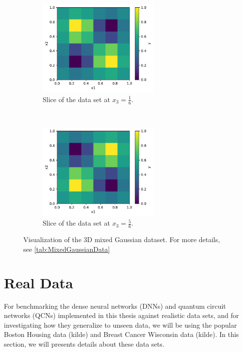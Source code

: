 \begin{figure}[H]
    \centering
    \begin{subfigure}[t]{0.5\textwidth}
        \centering
        \includegraphics[height=1.9in]{latex/figures/gaussian_3D_1.pdf}
        \caption{Slice of the data set at $x_3 = \frac{1}{6}$.}
        
    \end{subfigure}%
    ~ 
    \begin{subfigure}[t]{0.5\textwidth}
        \centering
        \includegraphics[height=1.9in]{latex/figures/gaussian_3D_2.pdf}
        \caption{Slice of the data set at $x_3 = \frac{5}{6}$.}
    \end{subfigure}
    \caption{Visualization of the 3D mixed Gaussian dataset. For more details, see \autoref{tab:MixedGaussianData}}
    \label{fig:mixed Gaussian 3D}
\end{figure}





\section{Real Data}\label{sec:Real Data stuff}
For benchmarking the dense neural networks (DNNs) and quantum circuit networks (QCNs) implemented in this thesis against realistic data sets, and for investigating how they generalize to unseen data, we will be using the popular Boston Housing data (kilde) and Breast Cancer Wisconsin data (kilde). In this section, we will presents details about these data sets. 

